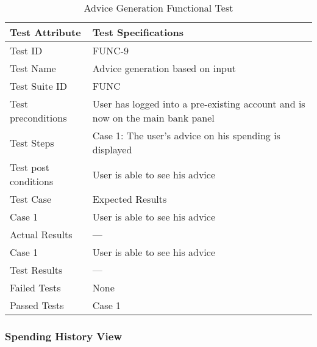 \documentclass{article}
\begin{document}
\begin{table}[htbp]
\begin{center}
\begin{tabular}{|l | l|}
\hline
Test Attribute & Test Specifications \\
\hline
Test ID & FUNC-9 \\
\hline
Test Name  & Advice generation based on input \\
\hline
Test Suite  ID & FUNC \\
\hline
Test preconditions & User has logged into a pre-existing account and is now on the main bank panel \\
\hline
Test Steps & Case 1: The user's advice on his spending is displayed\\
\hline
Test post conditions & User is able to see his advice \\
\hline
Test Case & Expected Results\\
\hline
Case 1  &  User is able to see his advice\\
\hline
Actual Results & ---\\
\hline
Case 1  &  User is able to see his advice\\
\hline
Test Results & ---\\
\hline
Failed Tests & None\\
\hline
Passed Tests & Case 1\\
\hline
\end{tabular}
\end{center}
\caption{Advice Generation Functional Test}
\end{table}
\label{table:2i}

\clearpage

\subsubsection{Spending History View}
\end{document}
